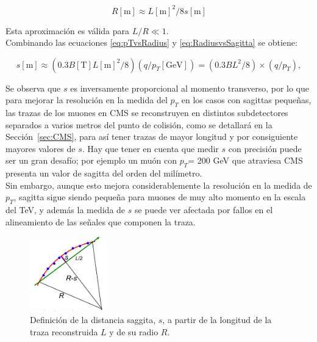 \begin{equation}
  R[\text{m}]\approx L[\text{m}]^{2}/8s[\text{m}]
\label{eq:RadiusvsSagitta}
\end{equation}

Esta aproximaci\'on es v\'alida para $L/R \ll 1$. \\

Combinando las ecuaciones \eqref{eq:pTvsRadius} y \eqref{eq:RadiusvsSagitta} se obtiene:

\begin{equation}
  s[\text{m}]\approx (0.3 B [\text{T}] L[\text{m}]^{2}/8) (q/p_{T}[\text{GeV}]) =  (0.3 BL^{2}/8) \times (q/p_{T}),
\label{eq:SagittavsPt}
\end{equation}

Se observa que $s$ es inversamente proporcional al momento transverso, por lo que para mejorar la resoluci\'on en la medida del $p_{T}$ en los casos con sagittas peque\~nas, las trazas de los muones en CMS se reconstruyen en distintos subdetectores separados a varios metros del punto de colisi\'on, como se detallar\'a en la Secci\'on~\ref{sec:CMS}, para as\'i tener trazas de mayor longitud y por consiguiente mayores valores de $s$. Hay que tener en cuenta que medir $s$ con precisi\'on puede ser un gran desaf\'io; por ejemplo un mu\'on con $p_{T}$= 200 GeV que atraviesa CMS presenta un valor de sagitta del orden del mil\'imetro.  \\
Sin embargo, aunque esto mejora considerablemente la resoluci\'on en la medida de $p_{T}$, sagitta sigue siendo peque\~na para muones de muy alto momento en la escala del TeV, y adem\'as la medida de $s$ se puede ver afectada por fallos en el alineamiento de las se\~nales que componen la traza. \\

\begin{figure}[h]
\centering
\includegraphics[width=0.30\textwidth]{figures/curvaturesketch.png}
\caption{Definici\'on de la distancia saggita, $s$, a partir de la longitud de la traza reconstruida $L$ y de su radio $R$.}
\label{fig:SagittaDef}
\end{figure}

